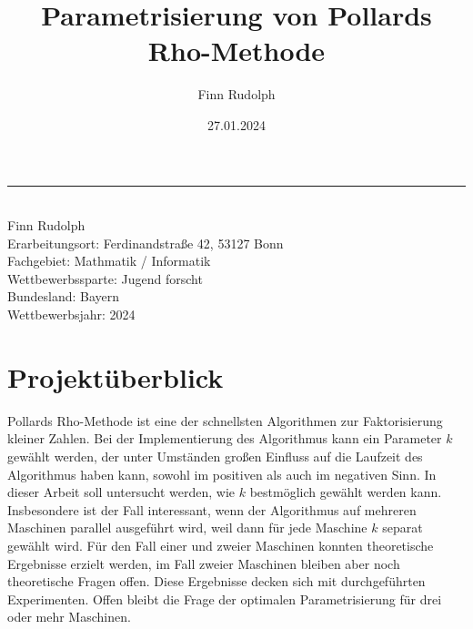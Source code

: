 \documentclass[a4paper, 10pt, ngerman]{article}
\title{Parametrisierung von Pollards Rho-Methode}
\author{Finn Rudolph}
\date{27.01.2024}
\begin{document}
\begin{titlepage}

    \noindent\rule{\textwidth}{0.4pt}

    \makeatletter
    \begin{flushleft}
        \textbf{\LARGE{\@title}} \\
        \vspace{1.5em}
        Finn Rudolph \\
        \vspace{1em}
        Erarbeitungsort: Ferdinandstraße 42, 53127 Bonn \\
        Fachgebiet: Mathmatik / Informatik \\
        Wettbewerbssparte: Jugend forscht \\
        Bundesland: Bayern \\
        Wettbewerbsjahr: 2024
    \end{flushleft}

    \vspace{0.5em}

    \section*{Projektüberblick}

    Pollards Rho-Methode ist eine der schnellsten Algorithmen zur Faktorisierung kleiner Zahlen. Bei der Implementierung des Algorithmus kann ein Parameter $k$ gewählt werden, der unter Umständen großen Einfluss auf die Laufzeit des Algorithmus haben kann, sowohl im positiven als auch im negativen Sinn. In dieser Arbeit soll untersucht werden, wie $k$ bestmöglich gewählt werden kann. Insbesondere ist der Fall interessant, wenn der Algorithmus auf mehreren Maschinen parallel ausgeführt wird, weil dann für jede Maschine $k$ separat gewählt wird. Für den Fall einer und zweier Maschinen konnten theoretische Ergebnisse erzielt werden, im Fall zweier Maschinen bleiben aber noch theoretische Fragen offen. Diese Ergebnisse decken sich mit durchgeführten Experimenten. Offen bleibt die Frage der optimalen Parametrisierung für drei oder mehr Maschinen.

    \vspace{1em}

    \begin{spacing}{1.2}
        \tableofcontents
    \end{spacing}

    \thispagestyle{empty}

\end{titlepage}
\end{document}
